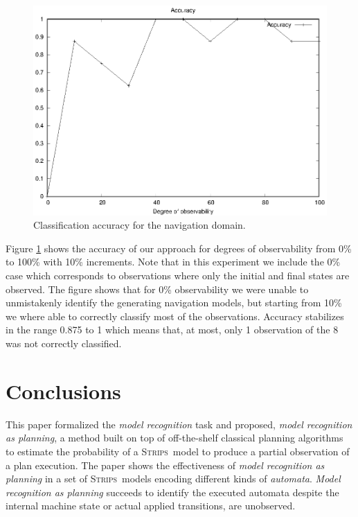 \documentclass[letterpaper]{article} %
\newcommand{\strips}{\textsc{Strips}}     %
\begin{document}
\begin{figure}[hbt!]
	\centering
	\includegraphics[width=\linewidth]{figures/navigation.eps}
	\caption{Classification accuracy for the navigation domain.}
	\label{fig:navigation_acc}
\end{figure}

Figure \ref{fig:navigation_acc} shows the accuracy of our approach for degrees of observability from 0\% to 100\% with 10\% increments. Note that in this experiment we include the 0\% case which corresponds to observations where only the initial and final states are observed. The figure shows that for 0\% observability we were unable to unmistakenly identify the generating navigation models, but starting from 10\% we where able to correctly classify most of the observations. Accuracy stabilizes in the range 0.875 to 1 which means that, at most, only 1 observation of the 8 was not correctly classified.


\section{Conclusions}
\label{sec:conclussions}
This paper formalized the {\em model recognition} task and proposed, {\em model recognition as planning}, a method built on top of off-the-shelf classical planning algorithms to estimate the probability of a \strips\ model to produce a partial observation of a plan execution. The paper shows the effectiveness of {\em model recognition as planning} in a set of \strips\ models encoding different kinds of {\em automata}. {\em Model recognition as planning} succeeds to identify the executed automata despite the internal machine state or actual applied transitions, are unobserved.
\end{document}
